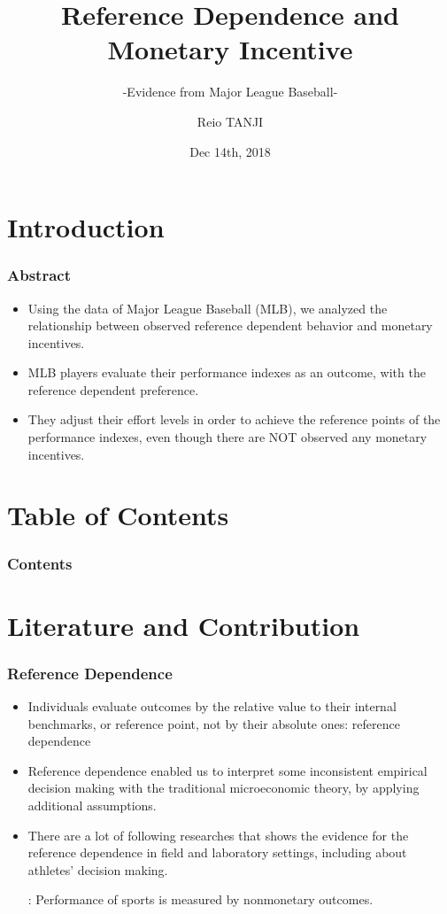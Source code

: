 \documentclass[dvipdfmx,12pt]{beamer}
\title{Reference Dependence and Monetary Incentive}
\subtitle{-Evidence from Major League Baseball-}
\author{Reio TANJI}
\date{Dec 14th, 2018}
\institute{Osaka University}
\begin{document}
\begin{frame}\frametitle{}
\titlepage
\end{frame}

\section{Introduction}

\begin{frame}\frametitle{Abstract}
  \begin{itemize}

    \item Using the data of Major League Baseball (MLB), we analyzed the relationship between observed reference dependent behavior and monetary incentives.

    \item MLB players evaluate their performance indexes as an outcome, with the reference dependent preference.

    \item They adjust their effort levels in order to achieve the reference points of the performance indexes, even though there are NOT observed any monetary incentives.
  \end{itemize}
\end{frame}

\section*{Table of Contents}
\begin{frame}\frametitle{Contents}
  \tableofcontents
\end{frame}

\section{Literature and Contribution}
\begin{frame}\frametitle{Reference Dependence}
  \begin{itemize}
    \item Individuals evaluate outcomes by the relative value to their internal benchmarks, or reference point, not by their absolute ones: reference dependence

    \item Reference dependence enabled us to interpret some inconsistent empirical decision making with the traditional microeconomic theory, by applying additional assumptions.

    \item There are a lot of following researches that shows the evidence for the reference dependence in field and laboratory settings, including about athletes' decision making.

    : Performance of sports is measured by nonmonetary outcomes.

  \end{itemize}
\end{frame}
\end{document}
